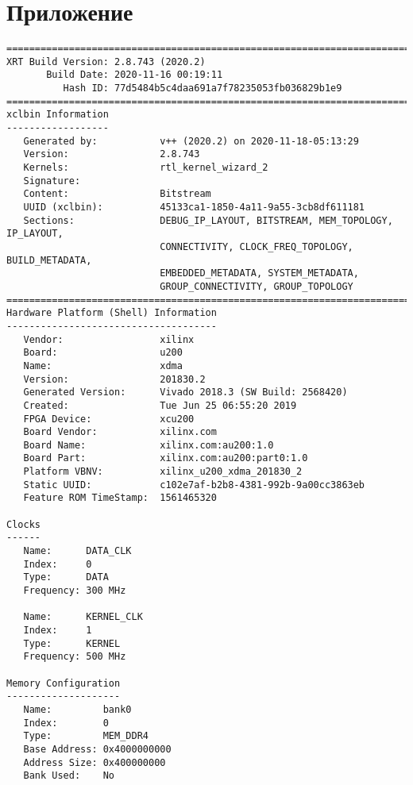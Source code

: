 \chapter*{Приложение}

\begin{center}
    \captionsetup{justification=raggedright,singlelinecheck=off}
    \begin{lstlisting}[label=lst:xclbin_info,caption=Файл vinc.xclbin.info]
==============================================================================
XRT Build Version: 2.8.743 (2020.2)
       Build Date: 2020-11-16 00:19:11
          Hash ID: 77d5484b5c4daa691a7f78235053fb036829b1e9
==============================================================================
xclbin Information
------------------
   Generated by:           v++ (2020.2) on 2020-11-18-05:13:29
   Version:                2.8.743
   Kernels:                rtl_kernel_wizard_2
   Signature:              
   Content:                Bitstream
   UUID (xclbin):          45133ca1-1850-4a11-9a55-3cb8df611181
   Sections:               DEBUG_IP_LAYOUT, BITSTREAM, MEM_TOPOLOGY, IP_LAYOUT, 
                           CONNECTIVITY, CLOCK_FREQ_TOPOLOGY, BUILD_METADATA, 
                           EMBEDDED_METADATA, SYSTEM_METADATA, 
                           GROUP_CONNECTIVITY, GROUP_TOPOLOGY
==============================================================================
Hardware Platform (Shell) Information
-------------------------------------
   Vendor:                 xilinx
   Board:                  u200
   Name:                   xdma
   Version:                201830.2
   Generated Version:      Vivado 2018.3 (SW Build: 2568420)
   Created:                Tue Jun 25 06:55:20 2019
   FPGA Device:            xcu200
   Board Vendor:           xilinx.com
   Board Name:             xilinx.com:au200:1.0
   Board Part:             xilinx.com:au200:part0:1.0
   Platform VBNV:          xilinx_u200_xdma_201830_2
   Static UUID:            c102e7af-b2b8-4381-992b-9a00cc3863eb
   Feature ROM TimeStamp:  1561465320

Clocks
------
   Name:      DATA_CLK
   Index:     0
   Type:      DATA
   Frequency: 300 MHz

   Name:      KERNEL_CLK
   Index:     1
   Type:      KERNEL
   Frequency: 500 MHz

Memory Configuration
--------------------
   Name:         bank0
   Index:        0
   Type:         MEM_DDR4
   Base Address: 0x4000000000
   Address Size: 0x400000000
   Bank Used:    No


\end{lstlisting}
\end{center}
